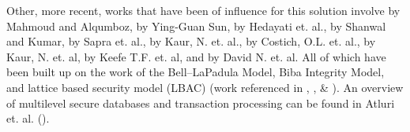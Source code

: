 Other, more recent, works that have been of influence for this solution involve \cite{mahmoud_encryption_2019} by Mahmoud and Alqumboz, \cite{sun_access_2011} by Ying-Guan Sun, \cite{hedayati_evaluation_2010} by Hedayati et. al., \cite{shanwal_secure_2013} by Shanwal and Kumar, \cite{sapra_development_2014} by Sapra et. al., \cite{kaur_performance_2004} by Kaur, N. et. al., \cite{costich_analysis_1991} by Costich, O.L. et. al., \cite{kaur_feedback_2007} by Kaur, N. et. al, \cite{keefe_database_1993} by Keefe T.F. et. al, and \cite{david_secure_1993} by David N. et. al. All of which have been built up on the work of the Bell–LaPadula Model, Biba Integrity Model, and lattice based security model (LBAC) (work referenced in \cite{bell_secure_1973}, \cite{biba_integrity_1977}, \& \cite{denning_lattice_1976}). An overview of multilevel secure databases and transaction processing can be found in Atluri et. al. (\cite{atluri_mls}).